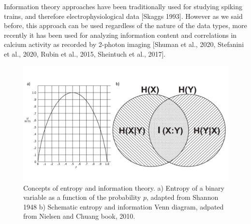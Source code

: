 Information theory approaches have been traditionally used for studying spiking trains, and therefore electrophysiological data [Skaggs 1993].
However as we said before, this approach can be used regardless of the nature of the data types, more recently it has been used for analyzing information content and correlations in calcium activity as recorded by 2-photon imaging [Shuman et al., 2020, Stefanini et al., 2020, Rubin et al., 2015, Sheintuch et al., 2017].

\begin{figure}
    \centering
    \includegraphics[width=\textwidth]{Figures/Chapter1/intro_fig_info.pdf}
    \caption{Concepts of entropy and information theory. a) Entropy of a binary variable as a function of the probability $p$, adapted from Shannon 1948 b) Schematic entropy and information Venn diagram, adpated from Nielsen and Chuang book, 2010.}
    \label{fig:chap1:info_theory_concepts}
\end{figure}
